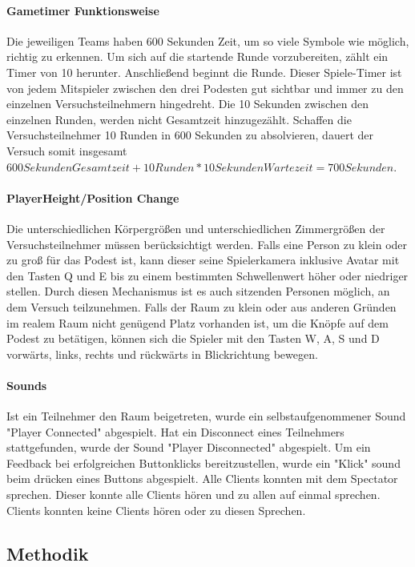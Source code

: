 \documentclass[a4paper,11pt]{article}%
\renewcommand{\\}{\vspace*{0.5\baselineskip} \newline}
\begin{document}
\paragraph{Gametimer Funktionsweise}
Die jeweiligen Teams haben 600 Sekunden Zeit, um so viele Symbole wie möglich, richtig zu erkennen. Um sich auf die startende Runde vorzubereiten, zählt ein Timer von 10 herunter. Anschließend beginnt die Runde. Dieser Spiele-Timer ist von jedem Mitspieler zwischen den drei Podesten gut sichtbar und immer zu den einzelnen Versuchsteilnehmern hingedreht. Die 10 Sekunden zwischen den einzelnen Runden, werden nicht Gesamtzeit hinzugezählt. Schaffen die Versuchsteilnehmer 10 Runden in 600 Sekunden zu absolvieren, dauert der Versuch somit insgesamt \\
$600 Sekunden Gesamtzeit + 10 Runden * 10 Sekunden Wartezeit = 700 Sekunden$.

\paragraph{PlayerHeight/Position Change}
Die unterschiedlichen Körpergrößen und unterschiedlichen Zimmergrößen der Versuchsteilnehmer müssen berücksichtigt werden.
Falls eine Person zu klein oder zu groß für das Podest ist, kann dieser seine Spielerkamera inklusive Avatar mit den Tasten Q und E bis zu einem bestimmten Schwellenwert höher oder niedriger stellen. Durch diesen Mechanismus ist es auch sitzenden Personen möglich, an dem Versuch teilzunehmen.
Falls der Raum zu klein oder aus anderen Gründen im realem Raum nicht genügend Platz vorhanden ist, um die Knöpfe auf dem Podest zu betätigen, können sich die Spieler mit den Tasten W, A, S und D vorwärts, links, rechts und rückwärts in Blickrichtung bewegen.

\paragraph{Sounds}
Ist ein Teilnehmer den Raum beigetreten, wurde ein selbstaufgenommener Sound "Player Connected" abgespielt. Hat ein Disconnect eines Teilnehmers stattgefunden, wurde der Sound "Player Disconnected" abgespielt.
Um ein Feedback bei erfolgreichen Buttonklicks bereitzustellen, wurde ein "Klick" sound beim drücken eines Buttons abgespielt.
Alle Clients konnten mit dem Spectator sprechen. Dieser konnte alle Clients hören und zu allen auf einmal sprechen. Clients konnten keine Clients hören oder zu diesen Sprechen.
	
\subsection{Methodik}
\end{document}
